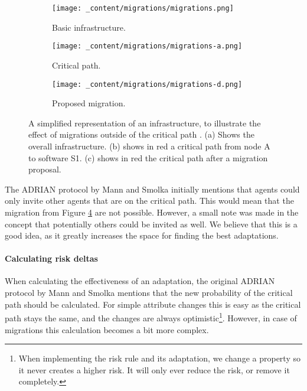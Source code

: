 \begin{figure}[H]
    \begin{subfigure}[b]{0.3\textwidth}
        \centering
        \texttt{[image: \_content/migrations/migrations.png]}
        \caption{Basic infrastructure.}
        \label{fig:migrations-outside-infrastructure}
    \end{subfigure}
    \begin{subfigure}[b]{0.3\textwidth}
        \centering
        \texttt{[image: \_content/migrations/migrations-a.png]}
        \caption{Critical path.}
        \label{fig:migrations-outside-attack}
    \end{subfigure}
    \begin{subfigure}[b]{0.3\textwidth}
        \centering
        \texttt{[image: \_content/migrations/migrations-d.png]}
        \caption{Proposed migration.}
        \label{fig:migrations-outside-proposal}
    \end{subfigure}
    \caption{A simplified representation of an infrastructure, to illustrate the effect of migrations outside of the critical path . (a) Shows the overall infrastructure. (b) shows in red a critical path from node A to software S1. (c) shows in red the critical path after a migration proposal.}
    \label{fig:migrations-outside}
\end{figure}

The ADRIAN protocol by Mann and Smolka \cite{mann2023ADRIAN} initially mentions that agents could only invite other agents that are on the critical path. This would mean that the migration from Figure \ref{fig:migrations-outside} are not possible. However, a small note was made in the concept that potentially others could be invited as well. We believe that this is a good idea, as it greatly increases the space for finding the best adaptations. 

\paragraph*{Calculating risk deltas}
\label{ssec:risk-deltas}
When calculating the effectiveness of an adaptation, the original ADRIAN protocol by Mann and Smolka \cite{mann2023ADRIAN} mentions that the new probability of the critical path should be calculated. For simple attribute changes this is easy as the critical path stays the same, and the changes are always optimistic\footnote{When implementing the risk rule and its adaptation, we change a property so it never creates a higher risk. It will only ever reduce the risk, or remove it completely.}. However, in case of migrations this calculation becomes a bit more complex. 

